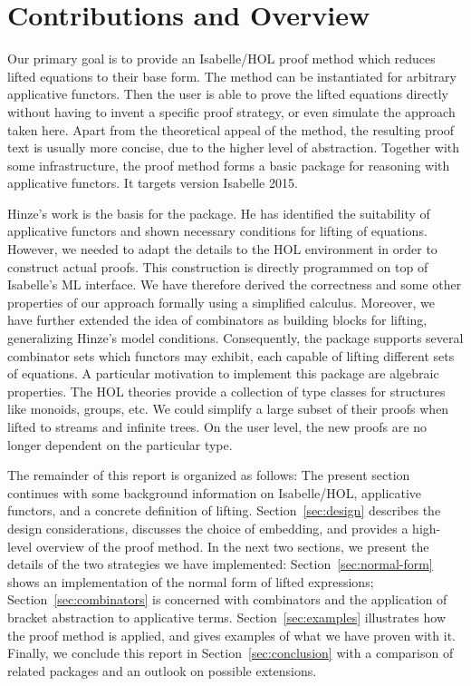 \section{Contributions and Overview}\label{subsec:contrib-overview}

Our primary goal is to provide an Isabelle/HOL proof method which reduces
lifted equations to their base form.
The method can be instantiated for arbitrary applicative functors.
Then the user is able to prove the lifted equations directly without having to
invent a specific proof strategy, or even simulate the approach taken here.
Apart from the theoretical appeal of the method, the resulting proof text is
usually more concise, due to the higher level of abstraction.
Together with some infrastructure, the proof method forms a basic package
for reasoning with applicative functors.
It targets version Isabelle 2015.

Hinze's work is the basis for the package.
He has identified the suitability of applicative functors and shown
necessary conditions for lifting of equations.
However, we needed to adapt the details to the HOL environment in order to
construct actual proofs.
This construction is directly programmed on top of Isabelle's ML interface.
We have therefore derived the correctness and some other properties of our
approach formally using a simplified calculus.
Moreover, we have further extended the idea of combinators as building blocks
for lifting, generalizing Hinze's model conditions.
Consequently, the package supports several combinator sets which functors may
exhibit, each capable of lifting different sets of equations.
A particular motivation to implement this package are algebraic properties.
The HOL theories provide a collection of type classes for structures like
monoids, groups, etc.
We could simplify a large subset of their proofs when lifted to streams
and infinite trees.
On the user level, the new proofs are no longer dependent on the particular
type.

The remainder of this report is organized as follows:
The present section continues with some background information on Isabelle/HOL,
applicative functors, and a concrete definition of lifting.
Section~\ref{sec:design} describes the design considerations, discusses the
choice of embedding, and provides a high-level overview of the proof method.
In the next two sections, we present the details of the two strategies we
have implemented:
Section~\ref{sec:normal-form} shows an implementation of the normal form of
lifted expressions;
Section~\ref{sec:combinators} is concerned with combinators and the application
of bracket abstraction to applicative terms.
Section~\ref{sec:examples} illustrates how the proof method is applied, and
gives examples of what we have proven with it.
Finally, we conclude this report in Section~\ref{sec:conclusion} with a
comparison of related packages and an outlook on possible extensions.


